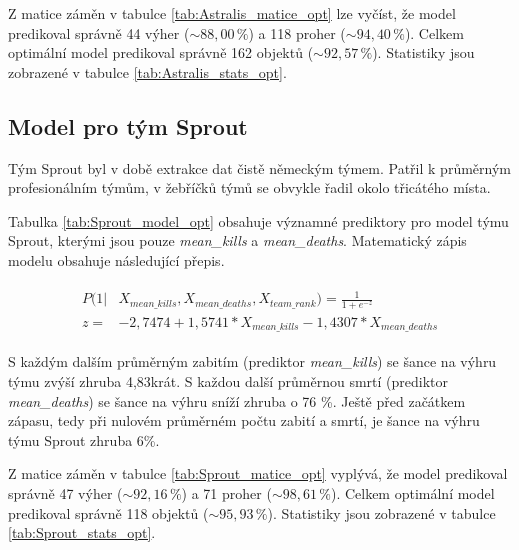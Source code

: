 



Z matice záměn v tabulce \ref{tab:Astralis_matice_opt} lze vyčíst, že model predikoval správně 44 výher ($\sim 88,00 \,\%$) a 118 proher ($\sim 94,40 \,\%$).
Celkem optimální model predikoval správně 162 objektů ($\sim 92,57 \,\%$). Statistiky jsou zobrazené v tabulce \ref{tab:Astralis_stats_opt}.

\subsection{Model pro tým Sprout}
Tým Sprout byl v době extrakce dat čistě německým týmem. Patřil k průměrným profesionálním týmům, v žebříčků týmů se obvykle řadil okolo třicátého místa.



Tabulka \ref{tab:Sprout_model_opt} obsahuje významné prediktory pro model týmu Sprout, kterými jsou pouze \textit{mean\_kills} a \textit{mean\_deaths}.
Matematický zápis modelu obsahuje následující přepis.

\begin{align}
    \begin{split}
        P(1 | &X_{mean\_kills}, X_{mean\_deaths}, X_{team\_rank}) = \frac{1}{1 + e^{-z}} \\
        z =   &-2,7474 + 1,5741*X_{mean\_kills} - 1,4307*X_{mean\_deaths}
    \end{split}
\end{align}

S každým dalším průměrným zabitím (prediktor \textit{mean\_kills}) se šance na výhru týmu zvýší zhruba 4,83krát. S každou další průměrnou smrtí (prediktor \textit{mean\_deaths})
se šance na výhru sníží zhruba o 76 \%. Ještě před začátkem zápasu, tedy při nulovém průměrném počtu zabití a smrtí, je šance na výhru týmu Sprout zhruba 6\%.





Z matice záměn v tabulce \ref{tab:Sprout_matice_opt} vyplývá, že model predikoval správně 47 výher ($\sim 92,16 \,\%$) a 71 proher ($\sim 98,61 \,\%$).
Celkem optimální model predikoval správně 118 objektů ($\sim 95,93 \,\%$). Statistiky jsou zobrazené v tabulce \ref{tab:Sprout_stats_opt}.

